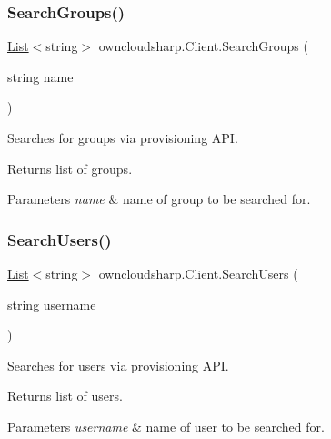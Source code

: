 \subsubsection{\texorpdfstring{Search\+Groups()}{SearchGroups()}}
{\footnotesize\ttfamily \hyperlink{classowncloudsharp_1_1_client_a914c144ebbe207958829523f7eda3609}{List}$<$string$>$ owncloudsharp.\+Client.\+Search\+Groups (\begin{DoxyParamCaption}\item[{string}]{name }\end{DoxyParamCaption})}



Searches for groups via provisioning A\+PI. 

\begin{DoxyReturn}{Returns}
list of groups.
\end{DoxyReturn}

\begin{DoxyParams}{Parameters}
{\em name} & name of group to be searched for.\\
\hline
\end{DoxyParams}
\mbox{\label{classowncloudsharp_1_1_client_ae50362f45f53ffe21fde6651f0873c0e}} 
\subsubsection{\texorpdfstring{Search\+Users()}{SearchUsers()}}
{\footnotesize\ttfamily \hyperlink{classowncloudsharp_1_1_client_a914c144ebbe207958829523f7eda3609}{List}$<$string$>$ owncloudsharp.\+Client.\+Search\+Users (\begin{DoxyParamCaption}\item[{string}]{username }\end{DoxyParamCaption})}



Searches for users via provisioning A\+PI. 

\begin{DoxyReturn}{Returns}
list of users.
\end{DoxyReturn}

\begin{DoxyParams}{Parameters}
{\em username} & name of user to be searched for.\\
\hline
\end{DoxyParams}
\mbox{\label{classowncloudsharp_1_1_client_a0939782439f44c5250d66147755d4c25}} 
